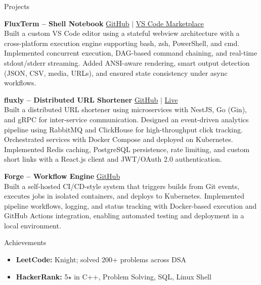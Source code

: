 \documentclass{resume} %
\begin{document}
\begin{rSection}{Projects}
\vspace{-1.25em}

\item \textbf{FluxTerm -- Shell Notebook} \hfill
  \href{https://github.com/0xflame-7/Flow}{GitHub} $|$
  \href{https://marketplace.visualstudio.com/items?itemName=0xflame-7.fluxterm}{VS Code Marketplace}\\
  Built a custom VS Code editor using a stateful webview architecture with a cross-platform execution engine supporting bash, zsh, PowerShell, and cmd. Implemented concurrent execution, DAG-based command chaining, and real-time stdout/stderr streaming. Added ANSI-aware rendering, smart output detection (JSON, CSV, media, URLs), and ensured state consistency under async workflows.

\item \textbf{fluxly -- Distributed URL Shortener} \hfill
  \href{https://github.com/0xflame-7/fluxly}{GitHub} $|$
  \href{https://fluxly.render.com/}{Live}\\
  Built a distributed URL shortener using microservices with NestJS, Go (Gin), and gRPC for inter-service communication. Designed an event-driven analytics pipeline using RabbitMQ and ClickHouse for high-throughput click tracking. Orchestrated services with Docker Compose and deployed on Kubernetes. Implemented Redis caching, PostgreSQL persistence, rate limiting, and custom short links with a React.js client and JWT/OAuth 2.0 authentication.

\item \textbf{Forge -- Workflow Engine} \hfill
  \href{https://github.com/0xflame-7/Forge}{GitHub}\\
  Built a self-hosted CI/CD-style system that triggers builds from Git events, executes jobs in isolated containers, and deploys to Kubernetes. Implemented pipeline workflows, logging, and status tracking with Docker-based execution and GitHub Actions integration, enabling automated testing and deployment in a local environment.

\end{rSection}

\begin{rSection}{Achievements}
\begin{itemize}
  \item \textbf{LeetCode:} Knight; solved 200+ problems across DSA
  \item \textbf{HackerRank:} 5$\star$ in C++, Problem Solving, SQL, Linux Shell
\end{itemize}
\end{rSection}
\end{document}
